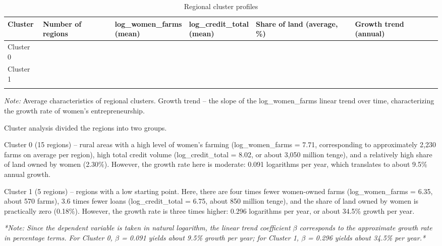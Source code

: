 \documentclass[pdflatex,sn-mathphys-ay]{sn-jnl}
\begin{document}
\begin{table}[htbp]
\caption{Regional cluster profiles}\label{tab:cluster-profiles}
\scriptsize
\renewcommand{\arraystretch}{1.1}
\setlength{\tabcolsep}{3pt}
\begin{tabularx}{\textwidth}{>{\raggedright\arraybackslash}p{}>{\centering\arraybackslash}p{}>{\raggedright\arraybackslash}X>{\raggedright\arraybackslash}X>{\raggedright\arraybackslash}X>{\centering\arraybackslash}p{}}
\toprule
Cluster & Number of regions & \shortstack[l]{log\_women\_farms\\(mean)} & \shortstack[l]{log\_credit\_total\\(mean)} & Share of land (average, \%) & Growth trend (annual)\\
\midrule
Cluster 0 & 15 & 7.71 & 8.02 & 2.30 & 0.091\\
Cluster 1 & 5 & 6.35 & 6.75 & 0.18 & 0.296\\
\botrule
\end{tabularx}
\setlength{\tabcolsep}{6pt}
\renewcommand{\arraystretch}{1}
\end{table}

\emph{Note:} Average characteristics of regional clusters. Growth trend -- the
slope of the log\_women\_farms linear trend over time, characterizing
the growth rate of women's entrepreneurship.

Cluster analysis divided the regions into two groups.

Cluster 0 (15 regions) -- rural areas with a high level of women's
farming (log\_women\_farms = 7.71, corresponding to approximately 2,230
farms on average per region), high total credit volume
(log\_credit\_total = 8.02, or about 3,050 million tenge), and a
relatively high share of land owned by women (2.30\%). However, the
growth rate here is moderate: 0.091 logarithms per year, which
translates to about 9.5\% annual growth.

Cluster 1 (5 regions) -- regions with a low starting point. Here, there
are four times fewer women-owned farms (log\_women\_farms = 6.35, about
570 farms), 3.6 times fewer loans (log\_credit\_total = 6.75, about 850
million tenge), and the share of land owned by women is practically zero
(0.18\%). However, the growth rate is three times higher: 0.296
logarithms per year, or about 34.5\% growth per year.

\emph{*Note: Since the dependent variable is taken in natural logarithm,
the linear trend coefficient $\beta$ corresponds to the approximate growth
rate in percentage terms. For Cluster 0, $\beta$ = 0.091 yields about 9.5\%
growth per year; for Cluster 1, $\beta$ = 0.296 yields about 34.5\% per
year.*}
\end{document}
